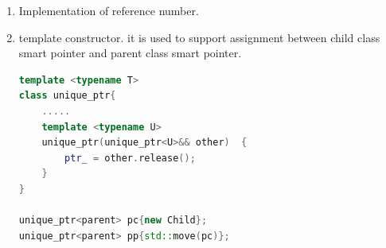 \documentclass[a4paper,11pt,twoside]{book}
\begin{document}
\begin{itemize}
\begin{enumerate}
		\item Implementation of reference number. 
		
		\item template constructor. it is used to support assignment between child class smart pointer and parent class smart pointer.
		
\begin{lstlisting}[frame=single, language=c++, mathescape=true]
template <typename T>
class unique_ptr{
	.....
	template <typename U>  
	unique_ptr(unique_ptr<U>&& other)  {
		ptr_ = other.release();  
	}
}

unique_ptr<parent> pc{new Child};
unique_ptr<parent> pp{std::move(pc)};
\end{lstlisting}

	\end{enumerate}

\end{itemize}
\end{document}
